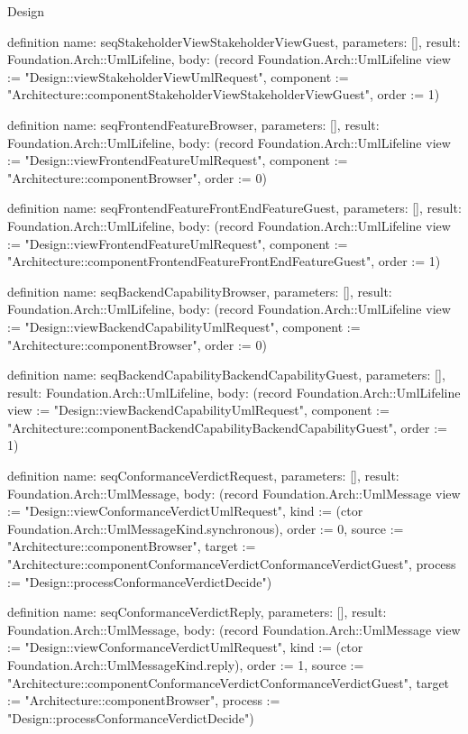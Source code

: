\begin{lexlean}{Design}
\begin{semanticmodule}
definition{
  name: seqStakeholderViewStakeholderViewGuest,
  parameters: [],
  result: Foundation.Arch::UmlLifeline,
  body: (record Foundation.Arch::UmlLifeline {view := "Design::viewStakeholderViewUmlRequest", component := "Architecture::componentStakeholderViewStakeholderViewGuest", order := 1})
}

definition{
  name: seqFrontendFeatureBrowser,
  parameters: [],
  result: Foundation.Arch::UmlLifeline,
  body: (record Foundation.Arch::UmlLifeline {view := "Design::viewFrontendFeatureUmlRequest", component := "Architecture::componentBrowser", order := 0})
}

definition{
  name: seqFrontendFeatureFrontEndFeatureGuest,
  parameters: [],
  result: Foundation.Arch::UmlLifeline,
  body: (record Foundation.Arch::UmlLifeline {view := "Design::viewFrontendFeatureUmlRequest", component := "Architecture::componentFrontendFeatureFrontEndFeatureGuest", order := 1})
}

definition{
  name: seqBackendCapabilityBrowser,
  parameters: [],
  result: Foundation.Arch::UmlLifeline,
  body: (record Foundation.Arch::UmlLifeline {view := "Design::viewBackendCapabilityUmlRequest", component := "Architecture::componentBrowser", order := 0})
}

definition{
  name: seqBackendCapabilityBackendCapabilityGuest,
  parameters: [],
  result: Foundation.Arch::UmlLifeline,
  body: (record Foundation.Arch::UmlLifeline {view := "Design::viewBackendCapabilityUmlRequest", component := "Architecture::componentBackendCapabilityBackendCapabilityGuest", order := 1})
}

definition{
  name: seqConformanceVerdictRequest,
  parameters: [],
  result: Foundation.Arch::UmlMessage,
  body: (record Foundation.Arch::UmlMessage {view := "Design::viewConformanceVerdictUmlRequest", kind := (ctor Foundation.Arch::UmlMessageKind.synchronous), order := 0, source := "Architecture::componentBrowser", target := "Architecture::componentConformanceVerdictConformanceVerdictGuest", process := "Design::processConformanceVerdictDecide"})
}

definition{
  name: seqConformanceVerdictReply,
  parameters: [],
  result: Foundation.Arch::UmlMessage,
  body: (record Foundation.Arch::UmlMessage {view := "Design::viewConformanceVerdictUmlRequest", kind := (ctor Foundation.Arch::UmlMessageKind.reply), order := 1, source := "Architecture::componentConformanceVerdictConformanceVerdictGuest", target := "Architecture::componentBrowser", process := "Design::processConformanceVerdictDecide"})
}


\end{semanticmodule}
\end{lexlean}
